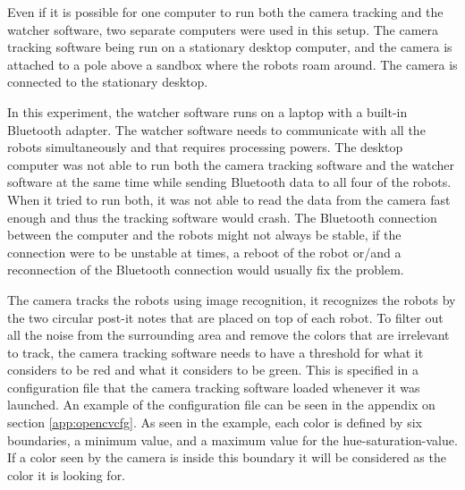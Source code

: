 Even if it is possible for one computer to run both the camera tracking and the watcher software, two separate computers were used in this setup. The camera tracking software being run on a stationary desktop computer, and the camera is attached to a pole above a sandbox where the robots roam around. The camera is connected to the stationary desktop. 

In this experiment, the watcher software runs on a laptop with a built-in Bluetooth adapter. The watcher software needs to communicate with all the robots simultaneously and that requires processing powers.
The desktop computer was not able to run both the camera tracking software and the watcher software at the same time while sending Bluetooth data to all four of the robots. When it tried to run both, it was not able to read the data from the camera fast enough and thus the tracking software would crash. The Bluetooth connection between the computer and the robots might not always be stable, if the connection were to be unstable at times, a reboot of the robot or/and a reconnection of the Bluetooth connection would usually fix the problem.

The camera tracks the robots using image recognition, it recognizes the robots by the two circular post-it notes that are placed on top of each robot. 
To filter out all the noise from the surrounding area and remove the colors that are irrelevant to track, the camera tracking software needs to have a threshold for what it considers to be red and what it considers to be green. This is specified in a configuration file that the camera tracking software loaded whenever it was launched. An example of the configuration file can be seen in the appendix on section \ref{app:opencvcfg}. As seen in the example, each color is defined by six boundaries, a minimum value, and a maximum value for the hue-saturation-value. If a color seen by the camera is inside this boundary it will be considered as the color it is looking for.\clearpage

